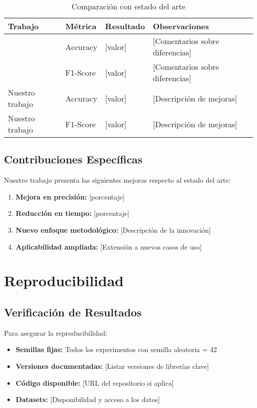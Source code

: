\begin{table}[htbp]
\centering
\caption{Comparación con estado del arte}
\begin{tabular}{@{}p{4cm}p{2.5cm}p{2.5cm}p{4cm}@{}}
\toprule
\textbf{Trabajo} & \textbf{Métrica} & \textbf{Resultado} & \textbf{Observaciones} \\
\midrule
\cite{autor2022} & Accuracy & [valor] & [Comentarios sobre diferencias] \\
\cite{autor2023} & F1-Score & [valor] & [Comentarios sobre diferencias] \\
Nuestro trabajo & Accuracy & [valor] & [Descripción de mejoras] \\
Nuestro trabajo & F1-Score & [valor] & [Descripción de mejoras] \\
\bottomrule
\end{tabular}
\label{tab:comparacion_estado_arte}
\end{table}

\subsection{Contribuciones Específicas}

Nuestro trabajo presenta las siguientes mejoras respecto al estado del arte:

\begin{enumerate}
    \item \textbf{Mejora en precisión:} [porcentaje]%
    \item \textbf{Reducción en tiempo:} [porcentaje]%
    \item \textbf{Nuevo enfoque metodológico:} [Descripción de la innovación]
    \item \textbf{Aplicabilidad ampliada:} [Extensión a nuevos casos de uso]
\end{enumerate}

\section{Reproducibilidad}

\subsection{Verificación de Resultados}

Para asegurar la reproducibilidad:

\begin{itemize}
    \item \textbf{Semillas fijas:} Todos los experimentos con semilla aleatoria = 42
    \item \textbf{Versiones documentadas:} [Listar versiones de librerías clave]
    \item \textbf{Código disponible:} [URL del repositorio si aplica]
    \item \textbf{Datasets:} [Disponibilidad y acceso a los datos]
\end{itemize}

